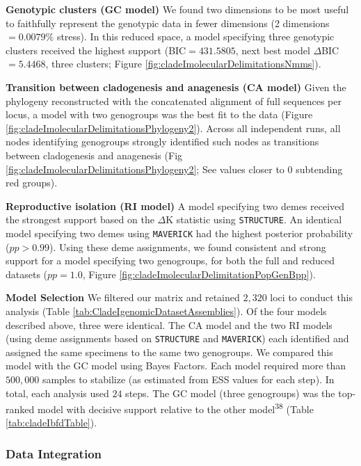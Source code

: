 \documentclass[
  11pt,
]{article}
\begin{document}
\textbf{Genotypic clusters (GC model)} We found two dimensions to be most useful to faithfully represent the genotypic data in fewer dimensions (2 dimensions \(=0.0079\%\) stress). In this reduced space, a model specifying three genotypic clusters received the highest support (BIC\(=431.5805\), next best model \(\Delta\)BIC\(=5.4468\), three clusters; Figure \ref{fig:cladeImolecularDelimitationsNmms}).

\textbf{Transition between cladogenesis and anagenesis (CA model)} Given the phylogeny reconstructed with the concatenated alignment of full sequences per locus, a model with two genogroups was the best fit to the data (Figure \ref{fig:cladeImolecularDelimitationsPhylogeny2}). Across all independent runs, all nodes identifying genogroups strongly identified such nodes as transitions between cladogenesis and anagenesis (Fig \ref{fig:cladeImolecularDelimitationsPhylogeny2}; See values closer to \(0\) subtending red groups).

\textbf{Reproductive isolation (RI model)} A model specifying two demes received the strongest support based on the \(\Delta\)K statistic using \texttt{STRUCTURE}. An identical model specifying two demes using \texttt{MAVERICK} had the highest posterior probability (\(pp>0.99\)). Using these deme assignments, we found consistent and strong support for a model specifying two genogroups, for both the full and reduced datasets (\(pp=1.0\), Figure \ref{fig:cladeImolecularDelimitationPopGenBpp}).

\textbf{Model Selection} We filtered our matrix and retained \(2,320\) loci to conduct this analysis (Table \ref{tab:CladeIgenomicDatasetAssemblies}). Of the four models described above, three were identical. The CA model and the two RI models (using deme assignments based on \texttt{STRUCTURE} and \texttt{MAVERICK}) each identified and assigned the same specimens to the same two genogroups. We compared this model with the GC model using Bayes Factors. Each model required more than \(500,000\) samples to stabilize (as estimated from ESS values for each step). In total, each analysis used \(24\) steps. The GC model (three genogroups) was the top-ranked model with decisive support relative to the other model\textsuperscript{38} (Table \ref{tab:cladeIbfdTable}).

\hypertarget{data-integration-1}{%
\subsubsection{Data Integration}\label{data-integration-1}}
\end{document}
